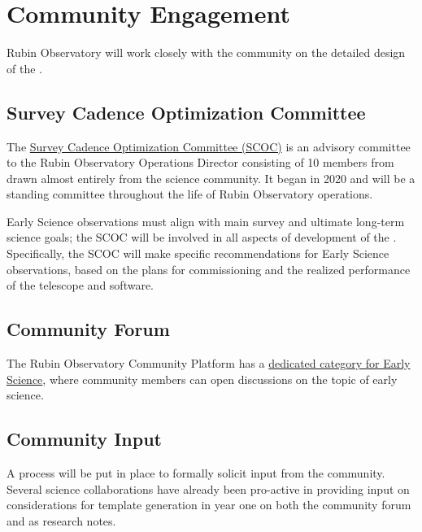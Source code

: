 \section{Community Engagement}

Rubin Observatory will work closely with the community on the detailed design of the \esp. 

\subsection{Survey Cadence Optimization Committee}
The \href{https://www.lsst.org/content/charge-survey-cadence-optimization-committee-scoc}{Survey Cadence Optimization Committee (SCOC)} is an advisory committee to the Rubin Observatory Operations Director consisting of 10 members from drawn almost entirely from the science community.
It began in 2020 and will be a standing committee throughout the life of Rubin Observatory operations. 

Early Science observations must align with main survey and ultimate long-term science goals; the SCOC will be involved in all aspects of development of the \esp. 
Specifically, the SCOC will make specific recommendations for Early Science observations, based on the plans for commissioning and the realized performance of the telescope and software. 


\subsection{Community Forum}

The Rubin Observatory Community Platform has a \href{https://community.lsst.org/t/about-the-early-science-category/5775}{dedicated category for Early Science}, where  community members can open discussions on the topic of early science. 

\subsection{Community Input}

A process will be put in place to formally solicit input from the community. 
Several science collaborations have already been pro-active in providing input on considerations for template generation in year one on both the community forum and as research notes. 